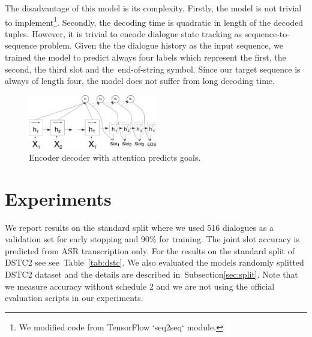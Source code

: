 \documentclass{itatnew}
\def\PB#1{\textcolor{red}{PB: \textit{#1}}}
\begin{document}
The disadvantage of this model is its complexity.
Firstly, the model is not trivial to implement\footnote{We modified code from TensorFlow `seq2seq` module.}. Secondly, the decoding time is quadratic in length of the decoded tuples.
However, it is trivial to encode dialogue state tracking as sequence-to-sequence problem. Given the the dialogue history as the input sequence, we trained the model to predict always four labels which represent the first, the second, the third slot and the~end-of-string symbol.
Since our target sequence is always of length four, the model does not suffer from long decoding time. 
\begin{figure}
\includegraphics[width=0.5\textwidth]{encdec}
\caption{Encoder decoder with attention predicts goals.}
\label{fig:encdec}
\end{figure}

\section{Experiments}
\label{sec:exp}

We report results on the standard split where we used 516 dialogues as a validation set for early stopping\cite{prechelt1998early} and 90\% for training. The joint slot accuracy is predicted from ASR transcription only.
For the results on the standard split of DSTC2 see see~Table~\ref{tab:dstc}.
We also evaluated the models randomly splitted DSTC2 dataset and the details are described in~Subsection\ref{sec:split}.
Note that we measure accuracy without schedule 2 and we are not using the official evaluation scripts in our experiments.

\end{document}

